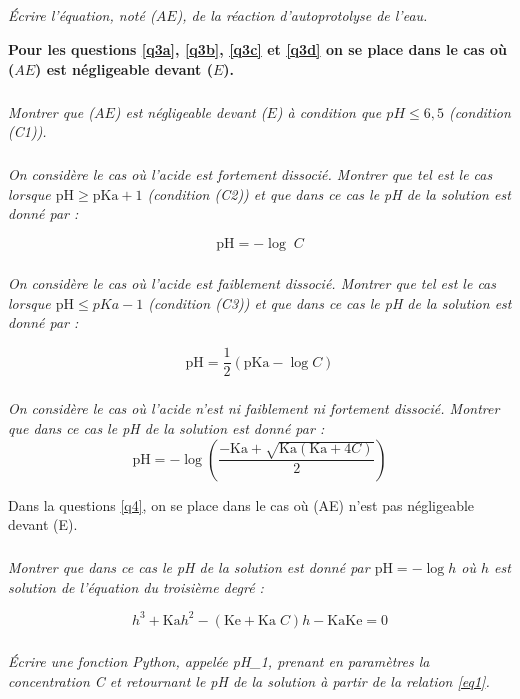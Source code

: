\documentclass[10pt,oneside]{article}
\begin{document}
\subparagraph{\label{q2}}
\textit{Écrire l’équation, noté ($AE$), de la réaction d’autoprotolyse de l’eau.}

\vspace{.5cm}

\textbf{Pour les questions \ref{q3a}, \ref{q3b}, \ref{q3c} et \ref{q3d} on se place dans le cas où ($AE$) est négligeable devant ($E$).}

\subparagraph{\label{q3a}}
\textit{Montrer que ($AE$) est négligeable devant ($E$) à condition que $pH \leq 6,5$ (condition (C1)).}

\subparagraph{\label{q3b}}
\textit{On considère le cas où l’acide est fortement dissocié. Montrer que tel est le cas lorsque 
$\text{pH} \geq \text{pKa} +1$ (condition (C2)) et que dans ce cas le pH de la solution est donné par : }

\begin{equation} \label{eq1}
\text{pH}= -\log\; C 
\end{equation}


\subparagraph{\label{q3c}}
\textit{On considère le cas où l’acide est faiblement dissocié. Montrer que tel est le cas lorsque 
$\text{pH} \leq pKa -1$ (condition (C3)) et que dans ce cas le pH de la solution est donné par : }

\begin{equation} \label{eq2}
\text{pH} = \dfrac{1}{2} \left(\text{pKa}- \log C \right)
\end{equation}

\subparagraph{\label{q3d}}
\textit{On considère le cas où l’acide n’est ni faiblement ni fortement dissocié. Montrer que dans ce cas 
le pH de la solution est donné par :}
\begin{equation} \label{eq3}
\text{pH} = - \log \left( \dfrac{-\text{Ka} + \sqrt{\text{Ka}\left( \text{Ka} + 4C\right)}}{2}\right)
\end{equation}


Dans la questions \ref{q4},
 on se place dans le cas où (AE) n’est pas négligeable devant (E). 
\subparagraph{\label{q4}}
\textit{Montrer que dans ce cas le pH de la solution est donné par $\text{pH} = - \log h$ où $h$ est solution de l’équation 
du troisième degré :}

\begin{equation} \label{eq4}
h^3 + \text{Ka}h^2 - \left(\text{Ke} + \text{Ka}\; C\right)h - \text{Ka} \text{Ke} = 0
\end{equation}


\subparagraph{\label{q5a}}
\textit{ Écrire une fonction Python, appelée pH\_1, prenant en paramètres la concentration C et retournant 
le pH de la solution à partir de la relation \eqref{eq1}. }
\end{document}
